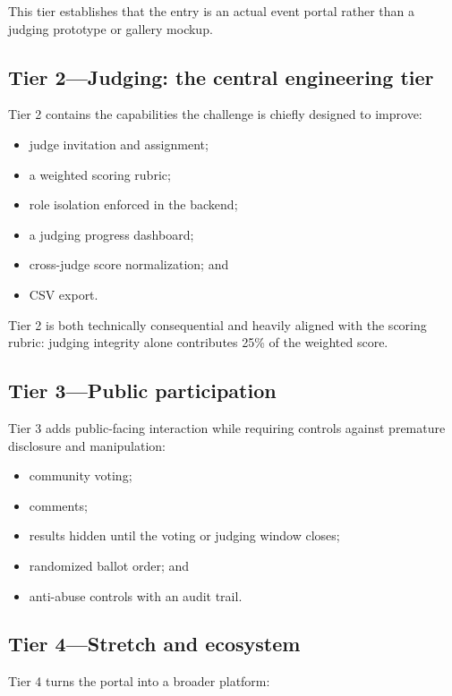 \documentclass[11pt]{article}
\begin{document}
This tier establishes that the entry is an actual event portal rather than a judging prototype or gallery mockup.

\subsection{Tier 2---Judging: the central engineering tier}

Tier 2 contains the capabilities the challenge is chiefly designed to improve:

\begin{itemize}
  \item judge invitation and assignment;
  \item a weighted scoring rubric;
  \item role isolation enforced in the backend;
  \item a judging progress dashboard;
  \item cross-judge score normalization; and
  \item CSV export.
\end{itemize}

Tier 2 is both technically consequential and heavily aligned with the scoring rubric: judging integrity alone contributes 25\% of the weighted score.

\subsection{Tier 3---Public participation}

Tier 3 adds public-facing interaction while requiring controls against premature disclosure and manipulation:

\begin{itemize}
  \item community voting;
  \item comments;
  \item results hidden until the voting or judging window closes;
  \item randomized ballot order; and
  \item anti-abuse controls with an audit trail.
\end{itemize}

\subsection{Tier 4---Stretch and ecosystem}

Tier 4 turns the portal into a broader platform:
\end{document}
